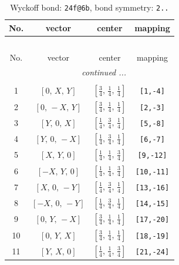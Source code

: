 \documentclass[fleqn,8pt]{jsarticle}
\begin{document}
\begin{longtable}{cccc}
\caption{Wyckoff bond: {\tt 24f@6b}, bond symmetry: {\tt 2..}}
 \\
 \hline \hline
No. & vector & center & mapping \\ \hline \endfirsthead

\multicolumn{3}{l}{\tablename\ \thetable{}} \\
 \hline \hline
No. & vector & center & mapping \\ \hline \endhead

 \hline \hline
\multicolumn{3}{r}{\footnotesize\it continued ...} \\ \endfoot

 \hline \hline
\multicolumn{3}{r}{} \\ \endlastfoot

1 & $\left[ 0,\, X,\, Y \right]$ & $\left[ \frac{3}{4},\, \frac{1}{4},\, \frac{1}{4} \right]$ & {\tt [1,-4]} \\ \hline
2 & $\left[ 0,\, - X,\, Y \right]$ & $\left[ \frac{3}{4},\, \frac{1}{4},\, \frac{1}{4} \right]$ & {\tt [2,-3]} \\ \hline
3 & $\left[ Y,\, 0,\, X \right]$ & $\left[ \frac{1}{4},\, \frac{3}{4},\, \frac{1}{4} \right]$ & {\tt [5,-8]} \\ \hline
4 & $\left[ Y,\, 0,\, - X \right]$ & $\left[ \frac{1}{4},\, \frac{3}{4},\, \frac{1}{4} \right]$ & {\tt [6,-7]} \\ \hline
5 & $\left[ X,\, Y,\, 0 \right]$ & $\left[ \frac{1}{4},\, \frac{1}{4},\, \frac{3}{4} \right]$ & {\tt [9,-12]} \\ \hline
6 & $\left[ - X,\, Y,\, 0 \right]$ & $\left[ \frac{1}{4},\, \frac{1}{4},\, \frac{3}{4} \right]$ & {\tt [10,-11]} \\ \hline
7 & $\left[ X,\, 0,\, - Y \right]$ & $\left[ \frac{1}{4},\, \frac{3}{4},\, \frac{1}{4} \right]$ & {\tt [13,-16]} \\ \hline
8 & $\left[ - X,\, 0,\, - Y \right]$ & $\left[ \frac{1}{4},\, \frac{3}{4},\, \frac{1}{4} \right]$ & {\tt [14,-15]} \\ \hline
9 & $\left[ 0,\, Y,\, - X \right]$ & $\left[ \frac{3}{4},\, \frac{1}{4},\, \frac{1}{4} \right]$ & {\tt [17,-20]} \\ \hline
10 & $\left[ 0,\, Y,\, X \right]$ & $\left[ \frac{3}{4},\, \frac{1}{4},\, \frac{1}{4} \right]$ & {\tt [18,-19]} \\ \hline
11 & $\left[ Y,\, X,\, 0 \right]$ & $\left[ \frac{1}{4},\, \frac{1}{4},\, \frac{3}{4} \right]$ & {\tt [21,-24]} \\ \hline

\end{longtable}
\end{document}
